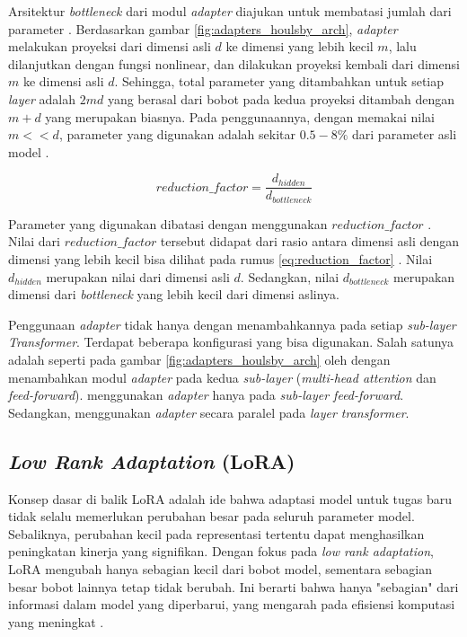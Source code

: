 Arsitektur \textit{bottleneck} dari modul \textit{adapter} diajukan untuk membatasi jumlah dari parameter \parencite{adapter_houlsby}. Berdasarkan gambar \ref{fig:adapters_houlsby_arch}, \textit{adapter} melakukan proyeksi dari dimensi asli $d$ ke dimensi yang lebih kecil $m$, lalu dilanjutkan dengan fungsi nonlinear, dan dilakukan proyeksi kembali dari dimensi $m$ ke dimensi asli $d$. Sehingga, total parameter yang ditambahkan untuk setiap \textit{layer} adalah $2md$ yang berasal dari bobot pada kedua proyeksi ditambah dengan $m+d$ yang merupakan biasnya. Pada penggunaannya, dengan memakai nilai $m << d$, parameter yang digunakan adalah sekitar $0.5-8\%$ dari parameter asli model \parencite{adapter_houlsby}.

\begin{equation}
    reduction\_factor = \frac{d_{hidden}}{d_{bottleneck}}
    \label{eq:reduction_factor}
\end{equation}

Parameter yang digunakan dibatasi dengan menggunakan $reduction\_factor$ \parencite{adapterhub}. Nilai dari $reduction\_factor$ tersebut didapat dari rasio antara dimensi asli dengan dimensi yang lebih kecil bisa dilihat pada rumus \ref{eq:reduction_factor} \parencite{adapterhub}. Nilai $d_{hidden}$ merupakan nilai dari dimensi asli $d$. Sedangkan, nilai $d_{bottleneck}$ merupakan dimensi dari \textit{bottleneck} yang lebih kecil dari dimensi aslinya.

Penggunaan \textit{adapter} tidak hanya dengan menambahkannya pada setiap \textit{sub-layer Transformer}. Terdapat beberapa konfigurasi yang bisa digunakan. Salah satunya adalah seperti pada gambar \ref{fig:adapters_houlsby_arch} oleh \parencite{adapter_houlsby} dengan menambahkan modul \textit{adapter} pada kedua \textit{sub-layer} (\textit{multi-head attention} dan \textit{feed-forward}). \parencite{adapter_pfeiffer} menggunakan \textit{adapter} hanya pada \textit{sub-layer feed-forward}. Sedangkan, \citeauthor{uvpl} menggunakan \textit{adapter} secara paralel pada \textit{layer transformer}.

\subsection{\textit{Low Rank Adaptation} (LoRA)}

Konsep dasar di balik LoRA adalah ide bahwa adaptasi model untuk tugas baru tidak selalu memerlukan perubahan besar pada seluruh parameter model. Sebaliknya, perubahan kecil pada representasi tertentu dapat menghasilkan peningkatan kinerja yang signifikan. Dengan fokus pada \textit{low rank adaptation}, LoRA mengubah hanya sebagian kecil dari bobot model, sementara sebagian besar bobot lainnya tetap tidak berubah. Ini berarti bahwa hanya "sebagian" dari informasi dalam model yang diperbarui, yang mengarah pada efisiensi komputasi yang meningkat \parencite{lora}.

